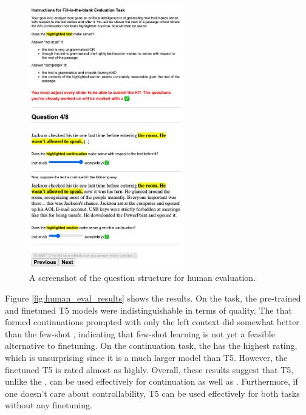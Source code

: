 \begin{figure}[ht]
    \centering
    \includegraphics[width=0.6\textwidth, frame]{figures/amt_screenshot.png}
    \caption{A screenshot of the question structure for human evaluation.}
    \label{fig:amturk_ui}
\end{figure}

Figure \ref{fig:human_eval_results} shows the results.
On the \FitB{} task, the pre-trained and finetuned T5 models were indistinguishable in terms of quality.
The \LLM{} that formed continuations prompted with only the left context did somewhat better than the few-shot \LLM{}, indicating that few-shot learning is not yet a feasible alternative to finetuning.
On the continuation task, the \LLM{} has the highest rating, which is unsurprising since it is a much larger model than T5.
However, the finetuned T5 is rated almost as highly.
Overall, these results suggest that T5, unlike the \LLM{}, can be used effectively for continuation as well as \FitB.
Furthermore, if one doesn't care about controllability, T5 can be used effectively for both tasks without any finetuning.

